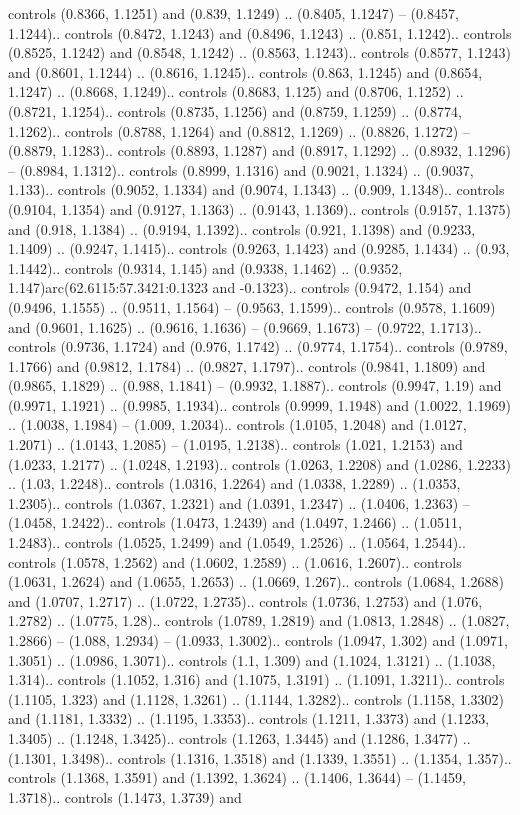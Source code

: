 controls (0.8366, 1.1251) and (0.839, 1.1249) .. (0.8405, 1.1247) -- (0.8457, 1.1244).. controls (0.8472, 1.1243) and (0.8496, 1.1243) .. (0.851, 1.1242).. controls (0.8525, 1.1242) and (0.8548, 1.1242) .. (0.8563, 1.1243).. controls (0.8577, 1.1243) and (0.8601, 1.1244) .. (0.8616, 1.1245).. controls (0.863, 1.1245) and (0.8654, 1.1247) .. (0.8668, 1.1249).. controls (0.8683, 1.125) and (0.8706, 1.1252) .. (0.8721, 1.1254).. controls (0.8735, 1.1256) and (0.8759, 1.1259) .. (0.8774, 1.1262).. controls (0.8788, 1.1264) and (0.8812, 1.1269) .. (0.8826, 1.1272) -- (0.8879, 1.1283).. controls (0.8893, 1.1287) and (0.8917, 1.1292) .. (0.8932, 1.1296) -- (0.8984, 1.1312).. controls (0.8999, 1.1316) and (0.9021, 1.1324) .. (0.9037, 1.133).. controls (0.9052, 1.1334) and (0.9074, 1.1343) .. (0.909, 1.1348).. controls (0.9104, 1.1354) and (0.9127, 1.1363) .. (0.9143, 1.1369).. controls (0.9157, 1.1375) and (0.918, 1.1384) .. (0.9194, 1.1392).. controls (0.921, 1.1398) and (0.9233, 1.1409) .. (0.9247, 1.1415).. controls (0.9263, 1.1423) and (0.9285, 1.1434) .. (0.93, 1.1442).. controls (0.9314, 1.145) and (0.9338, 1.1462) .. (0.9352, 1.147)arc(62.6115:57.3421:0.1323 and -0.1323).. controls (0.9472, 1.154) and (0.9496, 1.1555) .. (0.9511, 1.1564) -- (0.9563, 1.1599).. controls (0.9578, 1.1609) and (0.9601, 1.1625) .. (0.9616, 1.1636) -- (0.9669, 1.1673) -- (0.9722, 1.1713).. controls (0.9736, 1.1724) and (0.976, 1.1742) .. (0.9774, 1.1754).. controls (0.9789, 1.1766) and (0.9812, 1.1784) .. (0.9827, 1.1797).. controls (0.9841, 1.1809) and (0.9865, 1.1829) .. (0.988, 1.1841) -- (0.9932, 1.1887).. controls (0.9947, 1.19) and (0.9971, 1.1921) .. (0.9985, 1.1934).. controls (0.9999, 1.1948) and (1.0022, 1.1969) .. (1.0038, 1.1984) -- (1.009, 1.2034).. controls (1.0105, 1.2048) and (1.0127, 1.2071) .. (1.0143, 1.2085) -- (1.0195, 1.2138).. controls (1.021, 1.2153) and (1.0233, 1.2177) .. (1.0248, 1.2193).. controls (1.0263, 1.2208) and (1.0286, 1.2233) .. (1.03, 1.2248).. controls (1.0316, 1.2264) and (1.0338, 1.2289) .. (1.0353, 1.2305).. controls (1.0367, 1.2321) and (1.0391, 1.2347) .. (1.0406, 1.2363) -- (1.0458, 1.2422).. controls (1.0473, 1.2439) and (1.0497, 1.2466) .. (1.0511, 1.2483).. controls (1.0525, 1.2499) and (1.0549, 1.2526) .. (1.0564, 1.2544).. controls (1.0578, 1.2562) and (1.0602, 1.2589) .. (1.0616, 1.2607).. controls (1.0631, 1.2624) and (1.0655, 1.2653) .. (1.0669, 1.267).. controls (1.0684, 1.2688) and (1.0707, 1.2717) .. (1.0722, 1.2735).. controls (1.0736, 1.2753) and (1.076, 1.2782) .. (1.0775, 1.28).. controls (1.0789, 1.2819) and (1.0813, 1.2848) .. (1.0827, 1.2866) -- (1.088, 1.2934) -- (1.0933, 1.3002).. controls (1.0947, 1.302) and (1.0971, 1.3051) .. (1.0986, 1.3071).. controls (1.1, 1.309) and (1.1024, 1.3121) .. (1.1038, 1.314).. controls (1.1052, 1.316) and (1.1075, 1.3191) .. (1.1091, 1.3211).. controls (1.1105, 1.323) and (1.1128, 1.3261) .. (1.1144, 1.3282).. controls (1.1158, 1.3302) and (1.1181, 1.3332) .. (1.1195, 1.3353).. controls (1.1211, 1.3373) and (1.1233, 1.3405) .. (1.1248, 1.3425).. controls (1.1263, 1.3445) and (1.1286, 1.3477) .. (1.1301, 1.3498).. controls (1.1316, 1.3518) and (1.1339, 1.3551) .. (1.1354, 1.357).. controls (1.1368, 1.3591) and (1.1392, 1.3624) .. (1.1406, 1.3644) -- (1.1459, 1.3718).. controls (1.1473, 1.3739) and 